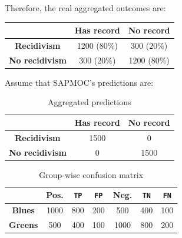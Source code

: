\begin{example}
\begin{description}
            Therefore, the real aggregated outcomes are:
            \begin{center}
                \footnotesize
                \begin{tabular}{c|cc}
                    \toprule
                                            & \textbf{Has record} & \textbf{No record} \\
                    \midrule
                    \textbf{Recidivism}     & 1200 ($80\%$) & 300 ($20\%$) \\
                    \textbf{No recidivism}  & 300 ($20\%$) & 1200 ($80\%$) \\
                    \bottomrule
                \end{tabular}
            \end{center}
            
            Assume that SAPMOC's predictions are:\\[-1.5em]
            \begin{minipage}{0.48\linewidth}
                \begin{table}[H]
                    \caption{Aggregated predictions}
                    \footnotesize
                    \begin{tabular}{c|cc}
                        \toprule
                                                & \textbf{Has record} & \textbf{No record} \\
                        \midrule
                        \textbf{Recidivism}     & 1500 & 0 \\
                        \textbf{No recidivism}  & 0 & 1500 \\
                        \bottomrule
                    \end{tabular}
                \end{table}
            \end{minipage}
            \hfill
            \begin{minipage}{0.48\linewidth}
                \begin{table}[H]
                    \caption{Group-wise confusion matrix}
                    \footnotesize
                    \begin{tabular}{c|ccc|ccc}
                        \toprule
                        & \textbf{Pos.} & \texttt{TP} & \texttt{FP} & \textbf{Neg.} & \texttt{TN} & \texttt{FN} \\ 
                        \midrule
                        \textbf{Blues} & 1000 & 800 & 200 & 500 & 400 & 100 \\ 
                        \textbf{Greens} & 500 & 400 & 100 & 1000 & 800 & 200 \\
                        \bottomrule
                    \end{tabular}
                \end{table}
            \end{minipage}


\end{description}
\end{example}

